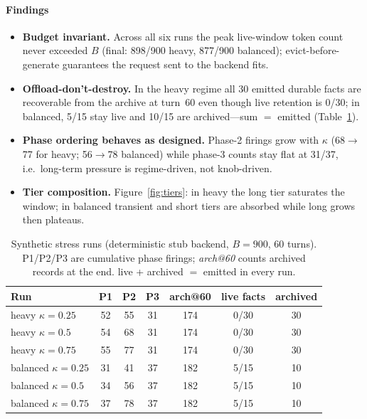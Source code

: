 \documentclass[10pt]{article}
\begin{document}
\paragraph{Findings}
\begin{itemize}
\item \textbf{Budget invariant.} Across all six runs the peak live-window token count never exceeded $B$ (final: 898/900 heavy, 877/900 balanced); evict-before-generate guarantees the request sent to the backend fits.
\item \textbf{Offload-don't-destroy.} In the heavy regime all 30 emitted durable facts are recoverable from the archive at turn~60 even though live retention is 0/30; in balanced, 5/15 stay live and 10/15 are archived---sum $=$ emitted (Table~\ref{tab:syn}).
\item \textbf{Phase ordering behaves as designed.} Phase-2 firings grow with $\kappa$ (68$\to$77 for heavy; 56$\to$78 balanced) while phase-3 counts stay flat at 31/37, i.e.\ long-term pressure is regime-driven, not knob-driven.
\item \textbf{Tier composition.} Figure~\ref{fig:tiers}: in heavy the long tier saturates the window; in balanced transient and short tiers are absorbed while long grows then plateaus.
\end{itemize}

\begin{table}[h]
\centering\small
\begin{tabular}{lcccccc}
\hline
Run & P1 & P2 & P3 & arch@60 & live facts & archived\\
\hline
heavy $\kappa{=}0.25$ & 52 & 55 & 31 & 174 & 0/30 & 30\\
heavy $\kappa{=}0.5$  & 54 & 68 & 31 & 174 & 0/30 & 30\\
heavy $\kappa{=}0.75$ & 55 & 77 & 31 & 174 & 0/30 & 30\\
balanced $\kappa{=}0.25$ & 31 & 41 & 37 & 182 & 5/15 & 10\\
balanced $\kappa{=}0.5$  & 34 & 56 & 37 & 182 & 5/15 & 10\\
balanced $\kappa{=}0.75$ & 37 & 78 & 37 & 182 & 5/15 & 10\\
\hline
\end{tabular}
\caption{Synthetic stress runs (deterministic stub backend, $B=900$, 60 turns). P1/P2/P3 are cumulative phase firings; \emph{arch@60} counts archived records at the end. live + archived $=$ emitted in every run.}\label{tab:syn}
\end{table}
\end{document}
